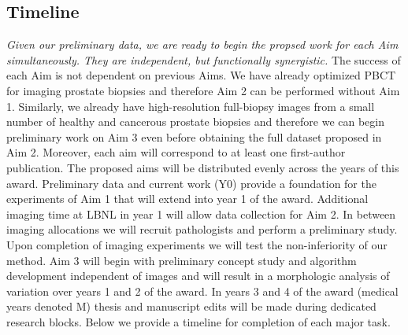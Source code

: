 \documentclass{NIHGrant}
\theoremstyle{theorem}
\begin{document}
\subsection*{Timeline}
%
\emph{Given our preliminary data, we are ready to begin the propsed work for each Aim simultaneously. They are independent, but functionally synergistic.} The success of each Aim is not dependent on previous Aims. We have already optimized PBCT for imaging prostate biopsies and therefore Aim 2 can be performed without Aim 1. Similarly, we already have high-resolution full-biopsy images from a small number of healthy and cancerous prostate biopsies and therefore we can begin preliminary work on Aim 3 even before obtaining the full dataset proposed in Aim 2. Moreover, each aim will correspond to at least one first-author publication. The proposed aims will be distributed evenly across the years of this award. Preliminary data and current work (Y0) provide a foundation for the experiments of Aim 1 that will extend into year 1 of the award. Additional imaging time at LBNL in year 1 will allow data collection for Aim 2. In between imaging allocations we will recruit pathologists and perform a preliminary study. Upon completion of imaging experiments we will test the non-inferiority of our method. Aim 3 will begin with preliminary concept study and algorithm development independent of images and will result in a morphologic analysis of variation over years 1 and 2 of the award. In years 3 and 4 of the award (medical years denoted M) thesis and manuscript edits will be made during dedicated research blocks. Below we provide a timeline for completion of each major task.
\end{document}
